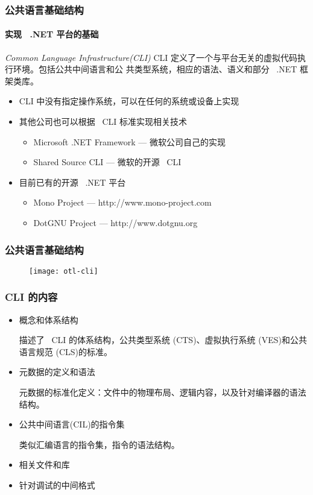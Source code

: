 \begin{frame}
\frametitle{公共语言基础结构}
\framesubtitle{实现 ~.NET 平台的基础}
\begin{block}{\textit{Common Language Infrastructure(CLI)}}
  \CJKindent CLI 定义了一个与平台无关的虚拟代码执行环境。包括公共中间语言和公
  共类型系统，相应的语法、语义和部分 ~.NET 框架类库。
\end{block}
\begin{itemize}
\item<2-| handout:1> CLI 中没有指定操作系统，可以在任何的系统或设备上实现
\item<3-| handout:1> 其他公司也可以根据 ~CLI 标准实现相关技术
  \begin{itemize}
  \item Microsoft .NET Framework --- 微软公司自己的实现
  \item Shared Source CLI --- 微软的开源 ~CLI
  \end{itemize}
\item<4-| handout:1> 目前已有的开源 ~.NET 平台
  \begin{itemize}
  \item Mono Project --- http://www.mono-project.com
  \item DotGNU Project --- http://www.dotgnu.org
  \end{itemize}
\end{itemize}
\end{frame}


\begin{frame}
\frametitle{公共语言基础结构}
\begin{figure}
\centering \texttt{[image: otl-cli]}
\end{figure}
\end{frame}

\begin{frame}
\frametitle{CLI 的内容}

\begin{itemize}
\CJKindent
\item 概念和体系结构

  描述了 ~CLI 的体系结构，公共类型系统 (CTS)、虚拟执行系统 (VES)和公共语言规范 (CLS)的标准。\pause

\item 元数据的定义和语法

  元数据的标准化定义：文件中的物理布局、逻辑内容，以及针对编译器的语法结构。\pause

\item 公共中间语言(CIL)的指令集

  类似汇编语言的指令集，指令的语法结构。\pause

\item 相关文件和库
\item 针对调试的中间格式

\end{itemize}

\end{frame}

